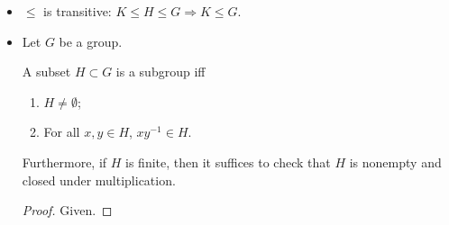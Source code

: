 \documentclass[../notes.tex]{subfiles}
\begin{document}
\begin{itemize}
    \item $\leq$ is transitive: $K\leq H\leq G\Longrightarrow K\leq G$.
    \item Let $G$ be a group.
    \begin{proposition}\label{prp:2.1}
        A subset $H\subset G$ is a subgroup iff
        \begin{enumerate}
            \item $H\neq\emptyset$;
            \item For all $x,y\in H$, $xy^{-1}\in H$.
        \end{enumerate}
        Furthermore, if $H$ is finite, then it suffices to check that $H$ is nonempty and closed under multiplication.
        \begin{proof}
            Given.
        \end{proof}
    \end{proposition}
\end{itemize}
\end{document}
